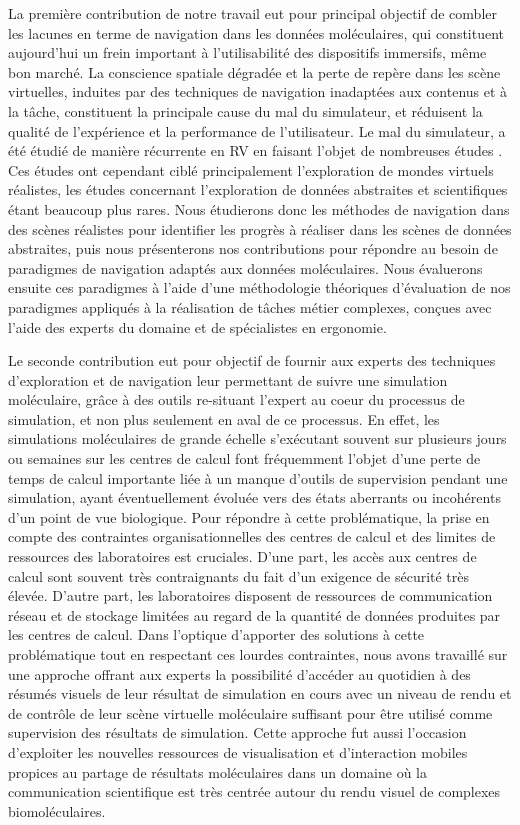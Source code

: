 La première contribution de notre travail eut pour principal objectif de combler les lacunes en terme de navigation dans les données moléculaires, qui constituent aujourd'hui un frein important à l'utilisabilité des dispositifs immersifs, même bon marché. La conscience spatiale dégradée et la perte de repère dans les scène virtuelles, induites par des techniques de navigation inadaptées aux contenus et à la tâche, constituent la principale cause du mal du simulateur, et réduisent la qualité de l'expérience et la performance de l'utilisateur. Le mal du simulateur, a été étudié de manière récurrente en RV en faisant l'objet de nombreuses études . Ces études ont cependant ciblé principalement l'exploration de mondes virtuels réalistes, les études concernant l'exploration de données abstraites et scientifiques étant beaucoup plus rares. Nous étudierons donc les méthodes de navigation dans des scènes réalistes pour identifier les progrès à réaliser dans les scènes de données abstraites, puis nous présenterons nos contributions pour répondre au besoin de paradigmes de navigation adaptés aux données moléculaires. Nous évaluerons ensuite ces paradigmes à l'aide d'une méthodologie théoriques d'évaluation de nos paradigmes appliqués à la réalisation de tâches métier complexes, conçues avec l'aide des experts du domaine et de spécialistes en ergonomie.

Le seconde contribution eut pour objectif de fournir aux experts des techniques d'exploration et de navigation leur permettant de suivre une simulation moléculaire, grâce à des outils re-situant l'expert au coeur du processus de simulation, et non plus seulement en aval de ce processus. En effet, les simulations moléculaires de grande échelle s’exécutant souvent sur plusieurs jours ou semaines sur les centres de calcul font fréquemment l'objet d'une perte de temps de calcul importante liée à un manque d'outils de supervision pendant une simulation, ayant éventuellement évoluée vers des états aberrants ou incohérents d'un point de vue biologique. Pour répondre à cette problématique, la prise en compte des contraintes organisationnelles des centres de calcul et des limites de ressources des laboratoires est cruciales. D'une part, les accès aux centres de calcul sont souvent très contraignants du fait d'un exigence de sécurité très élevée. D'autre part, les laboratoires disposent de ressources de communication réseau et de stockage limitées au regard de la quantité de données produites par les centres de calcul. Dans l'optique d'apporter des solutions à cette problématique tout en respectant ces lourdes contraintes, nous avons travaillé sur une approche offrant aux experts la possibilité d'accéder au quotidien à des résumés visuels de leur résultat de simulation en cours avec un niveau de rendu et de contrôle de leur scène virtuelle moléculaire suffisant pour être utilisé comme supervision des résultats de simulation. Cette approche fut aussi l'occasion d'exploiter les nouvelles ressources de visualisation et d'interaction mobiles propices au partage de résultats moléculaires dans un domaine où la communication scientifique est très centrée autour du rendu visuel de complexes biomoléculaires.

